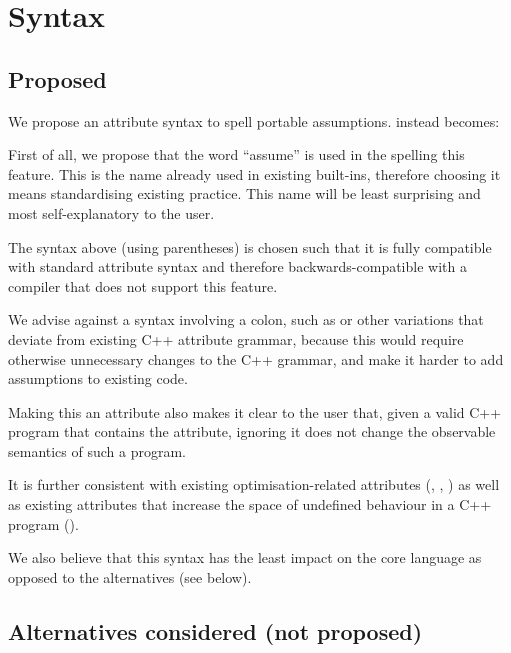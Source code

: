 

\section{Syntax}


\subsection{Proposed}

We propose an attribute syntax to spell portable assumptions.  instead becomes:

\forceindent
{}

First of all, we propose that the word ``assume'' is used in the spelling this feature. This is the name already used in existing built-ins, therefore choosing it means standardising existing practice. This name will be least surprising and most self-explanatory to the user.

The syntax above (using parentheses) is chosen such that it is fully compatible with standard attribute syntax and therefore backwards-compatible with a compiler that does not support this feature. 

We advise against a syntax involving a colon, such as  or other variations that deviate from existing C++ attribute grammar, because this would require otherwise unnecessary changes to the C++ grammar, and make it harder to add assumptions to existing code.

Making this an attribute also makes it clear to the user that, given a valid C++ program that contains the attribute, ignoring it does not change the observable semantics of such a program.

It is further consistent with existing optimisation-related attributes (\tcode{[[likely]]}, \tcode{[[unlikely]]}, ) as well as existing attributes that increase the space of undefined behaviour in a C++ program (\tcode{[[noreturn]]}).

We also believe that this syntax has the least impact on the core language as opposed to the alternatives (see below).

\subsection{Alternatives considered (not proposed)}

